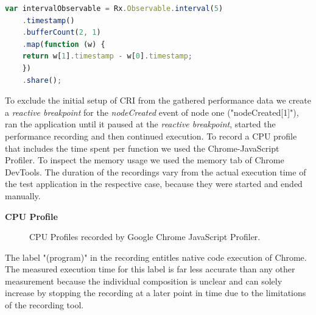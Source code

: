 	\begin{lstlisting}[language=JavaScript, caption={Example of RxJS code.},label={lst:performanceTestExtract}]
	var intervalObservable = Rx.Observable.interval(5)
	.timestamp()
	.bufferCount(2, 1)
	.map(function (w) {
	return w[1].timestamp - w[0].timestamp;
	})
	.share();	
	\end{lstlisting}

	To exclude the initial setup of CRI from the gathered performance data we create a \emph{reactive breakpoint} for the \emph{nodeCreated} event of node one ("nodeCreated[1]"), ran the application until it paused at the \emph{reactive breakpoint}, started the performance recording and then continued execution. To record a CPU profile that includes the time spent per function we used the Chrome-JavaScript Profiler. To inspect the memory usage we used the memory tab of Chrome DevTools. The duration of the recordings vary from the actual execution time of the test application in the respective case, because they were started and ended manually. 
	
	\textbf{CPU Profile}
	\begin{figure}[!h]
	\centering
	\hfill
	\caption{CPU Profiles recorded by Google Chrome JavaScript Profiler.}
	\end{figure}
	
	The label "(program)" in the recording entitles native code execution of Chrome. The measured execution time for this label is far less accurate than any other measurement because the individual composition is unclear and can solely increase by stopping the recording at a later point in time due to the limitations of the recording tool.
	
